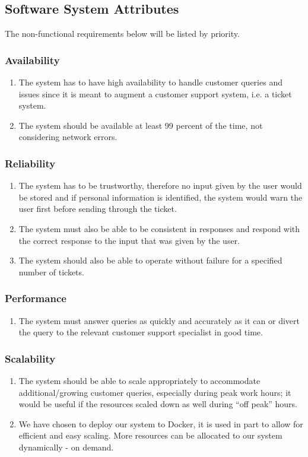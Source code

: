 \documentclass[11pt]{article}
\begin{document}
\subsection{Software System Attributes}%

The non-functional requirements below will be listed by priority.

\subsubsection{Availability}
\begin{enumerate}
	\item The system has to have high availability to handle customer queries and issues since it is meant to augment a customer support system, i.e. a ticket system.
	\item The system should be available at least 99 percent of the time, not considering network errors.
\end{enumerate}

\subsubsection{Reliability}
\begin{enumerate}
	\item The system has to be trustworthy, therefore no input given by the user would be stored and if personal information is identified, the system would warn the user first before sending through the ticket.
	\item The system must also be able to be consistent in responses and respond with the correct response to the input that was given by the user.
	\item The system should also be able to operate without failure for a specified number of tickets.
\end{enumerate}

\subsubsection{Performance}
\begin{enumerate}
	\item The system must answer queries as quickly and accurately as it can or divert the query to the relevant customer support specialist in good time. 
\end{enumerate}

\subsubsection{Scalability}
\begin{enumerate}
	\item The system should be able to scale appropriately to accommodate additional/growing customer queries, especially during peak work hours; it would be useful if the resources scaled down as well during “off peak” hours.
	\item We have chosen to deploy our system to Docker, it is used in part to allow for efficient and easy scaling. More resources can be allocated to our system dynamically - on demand.
\end{enumerate}
\end{document}
